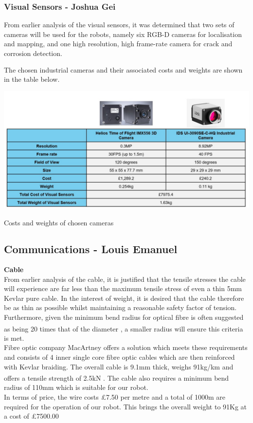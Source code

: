 \documentclass[11pt]{article}		%
\newcommand{\supercite}[1]{\textsuperscript{\cite{#1}}}		%
\begin{document}
		\subsubsection{Visual Sensors - Joshua Gei} \label{visualSensors}
		From earlier analysis of the visual sensors, it was determined that two sets of cameras will be used for the robots, namely six RGB-D cameras for localisation and mapping, and one high resolution, high frame-rate camera for crack and corrosion detection. 
		
		The chosen industrial cameras and their associated costs and weights are shown in the table below.
		\begin{table}[H]
	  		
	  		\centering
	  		\includegraphics[width=\textwidth]{cameracosts.jpg}
				\caption{Costs and weights of chosen cameras\supercite{camera}\supercite{camera2}}
				\label{cameracost}
			\end{table}
		
		\subsection[Communications]{Communications - Louis Emanuel}
		
			\textbf{Cable}\\
			From earlier analysis of the cable, it is justified that the tensile stresses the cable will experience are far less than the maximum tensile stress of even a thin 5mm Kevlar pure cable. In the interest of weight, it is desired that the cable therefore be as thin as possible whilst maintaining a reasonable safety factor of tension. Furthermore, given the minimum bend radius for optical fibre is often suggested as being 20 times that of the diameter \supercite{fibrebend}, a smaller radius will ensure this criteria is met.\\
	    	\hspace*{3ex}Fibre optic company MacArtney offers a solution which meets these requirements and consists of 4 inner single core fibre optic cables which are then reinforced with Kevlar braiding. The overall cable is 9.1mm thick, weighs 91kg/km and offers a tensile strength of 2.5kN \supercite{macartney}. The cable also requires a minimum bend radius of 110mm which is suitable for our robot. \\
	    	\hspace*{3ex}In terms of price, the wire costs £7.50 per metre and a total of 1000m are required for the operation of our robot. This brings the overall weight to 91Kg at a cost of £7500.00 
	
\end{document}

